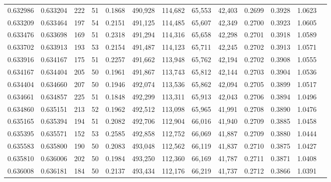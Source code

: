 \begin{tabular}{rrrrrrrrrrrrr}
0.632986 & 0.633204 &   222 &  51 &                                     0.1868 & 490,928 & 114,682 &  65,553 &  42,403 & 0.2699 & 0.3928 & 1.0623 \\
0.633209 & 0.633464 &   197 &  54 &                                     0.2151 & 491,125 & 114,485 &  65,607 &  42,349 & 0.2700 & 0.3923 & 1.0605 \\
0.633476 & 0.633698 &   169 &  51 &                                     0.2318 & 491,294 & 114,316 &  65,658 &  42,298 & 0.2701 & 0.3918 & 1.0589 \\
0.633702 & 0.633913 &   193 &  53 &                                     0.2154 & 491,487 & 114,123 &  65,711 &  42,245 & 0.2702 & 0.3913 & 1.0571 \\
0.633916 & 0.634167 &   175 &  51 &                                     0.2257 & 491,662 & 113,948 &  65,762 &  42,194 & 0.2702 & 0.3908 & 1.0555 \\
0.634167 & 0.634404 &   205 &  50 &                                     0.1961 & 491,867 & 113,743 &  65,812 &  42,144 & 0.2703 & 0.3904 & 1.0536 \\
0.634404 & 0.634660 &   207 &  50 &                                     0.1946 & 492,074 & 113,536 &  65,862 &  42,094 & 0.2705 & 0.3899 & 1.0517 \\
0.634661 & 0.634857 &   225 &  51 &                                     0.1848 & 492,299 & 113,311 &  65,913 &  42,043 & 0.2706 & 0.3894 & 1.0496 \\
0.634860 & 0.635151 &   213 &  52 &                                     0.1962 & 492,512 & 113,098 &  65,965 &  41,991 & 0.2708 & 0.3890 & 1.0476 \\
0.635165 & 0.635394 &   194 &  51 &                                     0.2082 & 492,706 & 112,904 &  66,016 &  41,940 & 0.2709 & 0.3885 & 1.0458 \\
0.635395 & 0.635571 &   152 &  53 &                                     0.2585 & 492,858 & 112,752 &  66,069 &  41,887 & 0.2709 & 0.3880 & 1.0444 \\
0.635583 & 0.635800 &   190 &  50 &                                     0.2083 & 493,048 & 112,562 &  66,119 &  41,837 & 0.2710 & 0.3875 & 1.0427 \\
0.635810 & 0.636006 &   202 &  50 &                                     0.1984 & 493,250 & 112,360 &  66,169 &  41,787 & 0.2711 & 0.3871 & 1.0408 \\
0.636008 & 0.636181 &   184 &  50 &                                     0.2137 & 493,434 & 112,176 &  66,219 &  41,737 & 0.2712 & 0.3866 & 1.0391 \\

\end{tabular}

